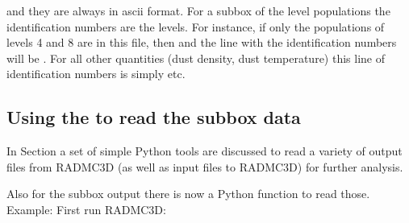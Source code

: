 \documentclass[letterpaper,10pt,english]{sphinxmanual}
\begin{document}
\begin{sphinxVerbatim}[commandchars=\\\{\}]
\PYG{p}{[}\PYG{p}{]}
\PYG{p}{[}\PYG{p}{]}
                                             
                                             
\PYG{p}{[}\PYG{p}{]}
\PYG{p}{[}\PYG{p}{]}
\end{sphinxVerbatim}

and they are always in ascii format. For a subbox of the level populations the
identification numbers are the levels. For instance, if only the populations of
levels 4 and 8 are in this file, then  and the line with
the identification numbers will be . For all other quantities
(dust density, dust temperature) this line of identification numbers is simply
 etc.


\subsection{Using the  to read the subbox data}
\label{\detokenize{toolsinside:using-the-radmc3d-tools-to-read-the-subbox-data}}
In Section {\hyperref[\detokenize{pythontools:sec-simpleread-tools}]{}} a set of simple Python tools are
discussed to read a variety of output files from RADMC\sphinxhyphen{}3D (as well as input
files to RADMC\sphinxhyphen{}3D) for further analysis.

Also for the subbox output there is now a Python function to read those.
Example: First run RADMC\sphinxhyphen{}3D:
\end{document}
